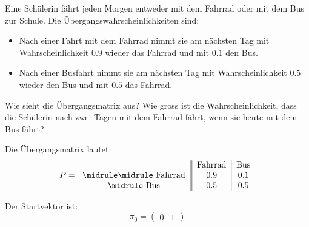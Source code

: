 \begin{myexercise}[Verkehrsmittel]
    Eine Schülerin fährt jeden Morgen entweder mit dem Fahrrad oder mit dem Bus zur Schule. Die Übergangswahrscheinlichkeiten sind:
    \begin{itemize}
        \item Nach einer Fahrt mit dem Fahrrad nimmt sie am nächsten Tag mit Wahrscheinlichkeit $0.9$ wieder das Fahrrad und mit $0.1$ den Bus.
        \item Nach einer Busfahrt nimmt sie am nächsten Tag mit Wahrscheinlichkeit $0.5$ wieder den Bus und mit $0.5$ das Fahrrad.
    \end{itemize}
    Wie sieht die Übergangsmatrix aus? Wie gross ist die Wahrscheinlichkeit, dass die Schülerin nach zwei Tagen mit dem Fahrrad fährt, wenn sie heute mit dem Bus fährt?
    \begin{myanswer}
        Die Übergangsmatrix lautet:
        \[
            P =
            \begin{tabular}{c||c|c}
                        & Fahrrad & Bus \\
                \midrule\midrule
                Fahrrad & 0.9     & 0.1 \\
                \midrule
                Bus     & 0.5     & 0.5 \\
            \end{tabular}
        \]

        Der Startvektor ist:
        \[
            \pi_0 =
            \begin{pmatrix}
                0 & 1
            \end{pmatrix}
        \]


\end{myanswer}
\end{myexercise}
